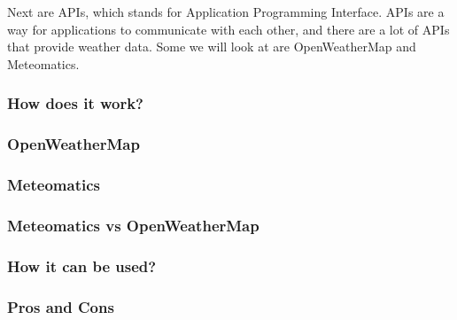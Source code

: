 \documentclass[../paper.tex]{subfiles}
\begin{document}
    Next are APIs, which stands for Application Programming Interface.
    APIs are a way for applications to communicate with each other, and there are a lot of APIs that provide weather data.
    Some we will look at are OpenWeatherMap and Meteomatics.

    \subsubsection{How does it work?}

    \subsubsection{OpenWeatherMap}

    \subsubsection{Meteomatics}

    \subsubsection{Meteomatics vs OpenWeatherMap}

    \subsubsection{How it can be used?}

    \subsubsection{Pros and Cons}
\end{document}
